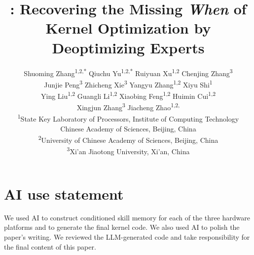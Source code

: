 \documentclass{article} %
\title{\sys: Recovering the Missing \emph{When} of \\ Kernel Optimization by Deoptimizing Experts}
\author{%
\begin{minipage}[t]{\dimexpr\textwidth-2\tabcolsep\relax}
\centering
Shuoming Zhang\textsuperscript{1,2,*} \quad Qiuchu Yu\textsuperscript{1,2,*} \quad Ruiyuan Xu\textsuperscript{1,2} \quad Chenjing Zhang\textsuperscript{3} \\
Junjie Peng\textsuperscript{3} \quad Zhicheng Xie\textsuperscript{3} \quad Yangyu Zhang\textsuperscript{1,2} \quad Xiyu Shi\textsuperscript{1} \\
Ying Liu\textsuperscript{1,2} \quad Guangli Li\textsuperscript{1,2} \quad Xiaobing Feng\textsuperscript{1,2} \quad Huimin Cui\textsuperscript{1,2} \\
Xingjun Zhang\textsuperscript{3} \quad Jiacheng Zhao\textsuperscript{1,2,\dag} \\[0.5em]
{\normalfont\small
\textsuperscript{1}State Key Laboratory of Processors, Institute of Computing Technology\\
Chinese Academy of Sciences, Beijing, China\\
\textsuperscript{2}University of Chinese Academy of Sciences, Beijing, China\\
\textsuperscript{3}Xi'an Jiaotong University, Xi'an, China}
\end{minipage}%
}
\begin{document}
\raggedbottom

\maketitle
\lhead{}
\renewcommand{\headrulewidth}{0pt}
\begingroup
\renewcommand{\thefootnote}{}
\renewcommand{\thefootnote}{*}
\renewcommand{\thefootnote}{\dag}
\endgroup

\begin{abstract}

\end{abstract}









\section*{AI use statement}
We used AI to construct conditioned skill memory for each of the three hardware platforms and to generate the final kernel code. We also used AI to polish the paper's writing. We reviewed the LLM-generated code and take responsibility for the final content of this paper.
\end{document}

